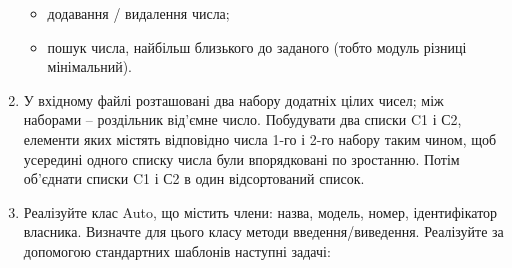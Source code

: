 \documentclass[]{article}
\begin{document}
\begin{enumerate}
  \begin{itemize}
  \item
    додавання / видалення числа;
  \item
    пошук числа, найбільш близького до заданого (тобто модуль різниці
    мінімальний).
  \end{itemize}
\item
  У вхідному файлі розташовані два набору додатніх цілих чисел; між
  наборами -- роздільник від'ємне число. Побудувати два списки C1 і С2,
  елементи яких містять відповідно числа 1-го і 2-го набору таким чином,
  щоб усередині одного списку числа були впорядковані по зростанню.
  Потім об'єднати списки C1 і С2 в один відсортований список.
\item
  Реалізуйте клас Auto, що містить члени: назва, модель, номер,
  ідентифікатор власника. Визначте для цього класу методи
  введення/виведення. Реалізуйте за допомогою стандартних шаблонів
  наступні задачі:


\end{enumerate}
\end{document}

